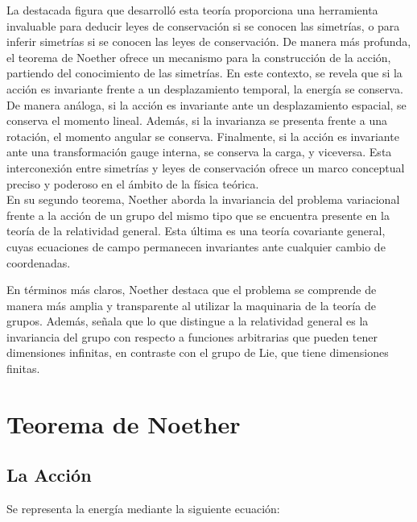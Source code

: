 \documentclass[a4paper,11pt]{article}
\begin{document}
La destacada figura que desarrolló esta teoría proporciona una herramienta invaluable para deducir leyes de conservación si se conocen las simetrías, o para inferir simetrías si se conocen las leyes de conservación. De manera más profunda, el teorema de Noether ofrece un mecanismo para la construcción de la acción, partiendo del conocimiento de las simetrías. En este contexto, se revela que si la acción es invariante frente a un desplazamiento temporal, la energía se conserva. De manera análoga, si la acción es invariante ante un desplazamiento espacial, se conserva el momento lineal. Además, si la invarianza se presenta frente a una rotación, el momento angular se conserva. Finalmente, si la acción es invariante ante una transformación gauge interna, se conserva la carga, y viceversa. Esta interconexión entre simetrías y leyes de conservación ofrece un marco conceptual preciso y poderoso en el ámbito de la física teórica.
\\

En su segundo teorema, Noether aborda la invariancia del problema variacional frente a la acción de un grupo del mismo tipo que se encuentra presente en la teoría de la relatividad general. Esta última es una teoría covariante general, cuyas ecuaciones de campo permanecen invariantes ante cualquier cambio de coordenadas.

En términos más claros, Noether destaca que el problema se comprende de manera más amplia y transparente al utilizar la maquinaria de la teoría de grupos. Además, señala que lo que distingue a la relatividad general es la invariancia del grupo con respecto a funciones arbitrarias que pueden tener dimensiones infinitas, en contraste con el grupo de Lie, que tiene dimensiones finitas.










\section{Teorema de Noether}
\subsection{La Acción}
 Se representa la energía mediante la siguiente ecuación:
 
\end{document}
